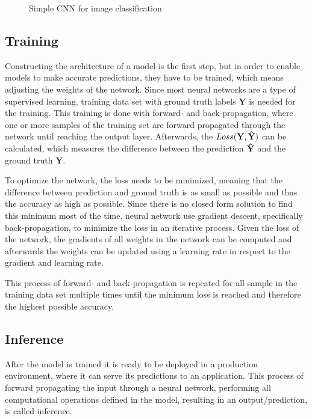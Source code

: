 \begin{figure}[!htb]
    \centering
    \resizebox{.95\linewidth}{!}{}
    \caption{Simple CNN for image classification}
    \label{fig:simpleCNN}
\end{figure}

\subsection{Training}
Constructing the architecture of a model is the first step, but in order to enable models to make accurate predictions, they have to be trained, which means adjusting the weights of the network. 
Since most neural networks are a type of supervised learning, training data set with ground truth labels $\mathbf{Y}$ is needed for the training.
This training is done with forward- and back-propagation, where one or more samples of the training set are forward propagated through the network until reaching the output layer. Afterwards, the $Loss\mathbf{(Y,\Hat{Y})}$ can be calculated, which measures the difference between the prediction $\mathbf{\Hat{Y}}$ and the ground truth $\mathbf{Y}$.

To optimize the network, the loss needs to be minimized, meaning that the difference between prediction and ground truth is as small as possible and thus the accuracy as high as possible.
Since there is no closed form solution to find this minimum most of the time, neural network use gradient descent, specifically back-propagation, to minimize the loss in an iterative process.
Given the loss of the network, the gradients of all weights in the network can be computed and afterwards the weights can be updated using a learning rate in respect to the gradient and learning rate.

This process of forward- and back-propagation is repeated for all sample in the training data set multiple times until the minimum loss is reached and therefore the highest possible accuracy.

\subsection{Inference}

After the model is trained it is ready to be deployed in a production environment, where it can serve its predictions to an application. This process of forward propagating the input through a neural network, performing all computational operations defined in the model, resulting in an output/prediction, is called inference.

